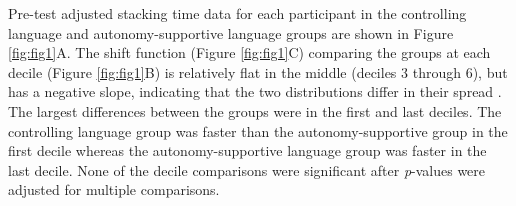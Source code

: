 \documentclass[doc,floatsintext,donotrepeattitle,letterpaper,12pt]{apa7}
\begin{document}
Pre-test adjusted stacking time data for each participant in the controlling language and autonomy-supportive language groups are shown in Figure \ref{fig:fig1}A. The shift function (Figure \ref{fig:fig1}C) comparing the groups at each decile (Figure \ref{fig:fig1}B) is relatively flat in the middle (deciles 3 through 6), but has a negative slope, indicating that the two distributions differ in their spread \autocite{R-rogme}. The largest differences between the groups were in the first and last deciles. The controlling language group was faster than the autonomy-supportive group in the first decile whereas the autonomy-supportive language group was faster in the last decile. None of the decile comparisons were significant after \emph{p}-values were adjusted for multiple comparisons.

\clearpage
\end{document}
